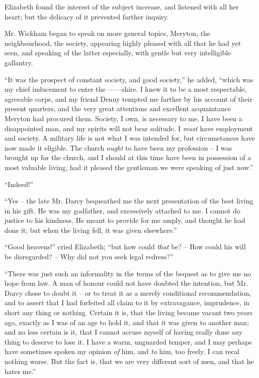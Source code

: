 Elizabeth found the interest of the subject increase, and
listened with all her heart; but the delicacy of it prevented
farther inquiry.

Mr. Wickham began to speak on more general topics,
Meryton, the neighbourhood, the society, appearing highly
pleased with all that he had yet seen, and speaking of the
latter especially, with gentle but very intelligible gallantry.

“It was the prospect of constant society, and good
society,” he added, “which was my chief inducement to
enter the ------shire. I knew it to be a most respectable,
agreeable corps, and my friend Denny tempted me farther
by his account of their present quarters, and the very great
attentions and excellent acquaintance Meryton had procured
them. Society, I own, is necessary to me. I have
been a disappointed man, and my spirits will not bear
solitude. I \textit{must} have employment and society. A
military life is not what I was intended for, but circumstances
have now made it eligible. The church \textit{ought} to
have been my profession -- I was brought up for the church,
and I should at this time have been in possession of a most
valuable living, had it pleased the gentleman we were
speaking of just now.”

“Indeed!”

“Yes -- the late Mr. Darcy bequeathed me the next
presentation of the best living in his gift. He was my
godfather, and excessively attached to me. I cannot do
justice to his kindness. He meant to provide for me
amply, and thought he had done it; but when the living
fell, it was given elsewhere.”

“Good heavens!” cried Elizabeth; “but how could
\textit{that} be? -- How could his will be disregarded? -- Why did
not you seek legal redress?”

“There was just such an informality in the terms of
the bequest as to give me no hope from law. A man of
honour could not have doubted the intention, but Mr.
Darcy chose to doubt it -- or to treat it as a merely conditional
recommendation, and to assert that I had forfeited
all claim to it by extravagance, imprudence, in short
any thing or nothing. Certain it is, that the living became
vacant two years ago, exactly as I was of an age to hold
it, and that it was given to another man; and no less
certain is it, that I cannot accuse myself of having really
done any thing to deserve to lose it. I have a warm,
unguarded temper, and I may perhaps have sometimes
spoken my opinion \textit{of} him, and \textit{to} him, too freely. I can
recal nothing worse. But the fact is, that we are very
different sort of men, and that he hates me.”

